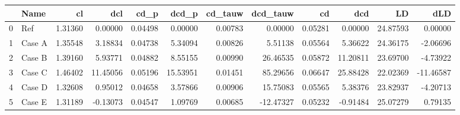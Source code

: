 \begin{tabular}{llrrrrrrrrrr}
\toprule
{} &    Name &      cl &      dcl &    cd\_p &    dcd\_p &  cd\_tauw &  dcd\_tauw &      cd &      dcd &       LD &       dLD \\
\midrule
0 &     Ref & 1.31360 &  0.00000 & 0.04498 &  0.00000 &  0.00783 &   0.00000 & 0.05281 &  0.00000 & 24.87593 &   0.00000 \\
1 &  Case A & 1.35548 &  3.18834 & 0.04738 &  5.34094 &  0.00826 &   5.51138 & 0.05564 &  5.36622 & 24.36175 &  -2.06696 \\
2 &  Case B & 1.39160 &  5.93771 & 0.04882 &  8.55155 &  0.00990 &  26.46535 & 0.05872 & 11.20811 & 23.69700 &  -4.73922 \\
3 &  Case C & 1.46402 & 11.45056 & 0.05196 & 15.53951 &  0.01451 &  85.29656 & 0.06647 & 25.88428 & 22.02369 & -11.46587 \\
4 &  Case D & 1.32608 &  0.95012 & 0.04658 &  3.57866 &  0.00906 &  15.75083 & 0.05565 &  5.38376 & 23.82937 &  -4.20713 \\
5 &  Case E & 1.31189 & -0.13073 & 0.04547 &  1.09769 &  0.00685 & -12.47327 & 0.05232 & -0.91484 & 25.07279 &   0.79135 \\
\bottomrule
\end{tabular}
